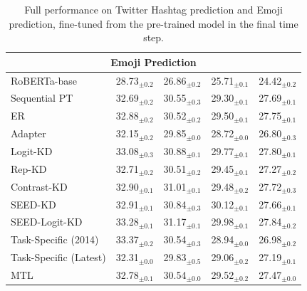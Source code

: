 \begin{table}[]
{\begin{tabular}{@{}lcccc@{}}
               \multicolumn{5}{c}{Emoji Prediction}                                                      \\ \midrule
RoBERTa-base  & 28.73$_{\pm 0.2}$            & 26.86$_{\pm 0.2}$            & 25.71$_{\pm 0.1}$            & 24.42$_{\pm 0.2}$            \\
Sequential PT       & 32.69$_{\pm 0.2}$            & 30.55$_{\pm 0.3}$            & 29.30$_{\pm 0.1}$            & 27.69$_{\pm 0.1}$            \\
ER            & 32.88$_{\pm 0.2}$            & 30.52$_{\pm 0.2}$            & 29.50$_{\pm 0.1}$            & 27.75$_{\pm 0.1}$            \\
Adapter       &      32.15$_{\pm 0.2}$         &        29.85$_{\pm 0.0}$         &            28.72$_{\pm 0.0}$          &     26.80$_{\pm 0.3}$             \\
Logit-KD      & 33.08$_{\pm 0.3}$            & 30.88$_{\pm 0.1}$            & 29.77$_{\pm 0.1}$            & 27.80$_{\pm 0.1}$            \\
Rep-KD        &      32.71$_{\pm 0.2}$         &        30.51$_{\pm 0.2}$              &        29.45$_{\pm 0.1}$          &        27.27$_{\pm 0.2}$          \\
Contrast-KD   & 32.90$_{\pm 0.1}$            & 31.01$_{\pm 0.1}$            & 29.48$_{\pm 0.2}$            & 27.72$_{\pm 0.3}$            \\
SEED-KD & 32.91$_{\pm 0.1}$ & 30.84$_{\pm 0.3}$ & 30.12$_{\pm 0.1}$ & 27.66$_{\pm 0.1}$ \\
SEED-Logit-KD &      33.28$_{\pm 0.1}$          &      31.17$_{\pm 0.1}$                &           29.98$_{\pm 0.1}$       &       27.84$_{\pm 0.2}$               \\
Task-Specific (2014) & 33.37$_{\pm 0.2}$            & 30.54$_{\pm 0.3}$            & 28.94$_{\pm 0.0}$            & 26.98$_{\pm 0.2}$            \\
Task-Specific (Latest) & 32.31$_{\pm 0.0}$            & 29.83$_{\pm 0.5}$            & 29.06$_{\pm 0.2}$            & 27.19$_{\pm 0.1}$            \\
MTL           &  32.78$_{\pm 0.1}$  & 30.54$_{\pm 0.0}$ & 29.52$_{\pm 0.2}$ &  27.47$_{\pm 0.0}$ \\  \bottomrule
\end{tabular}
}
\caption{\small Full performance on Twitter Hashtag prediction and Emoji prediction, fine-tuned from the pre-trained model in the final time step.}
\label{tab:twitter_full}
\end{table}



